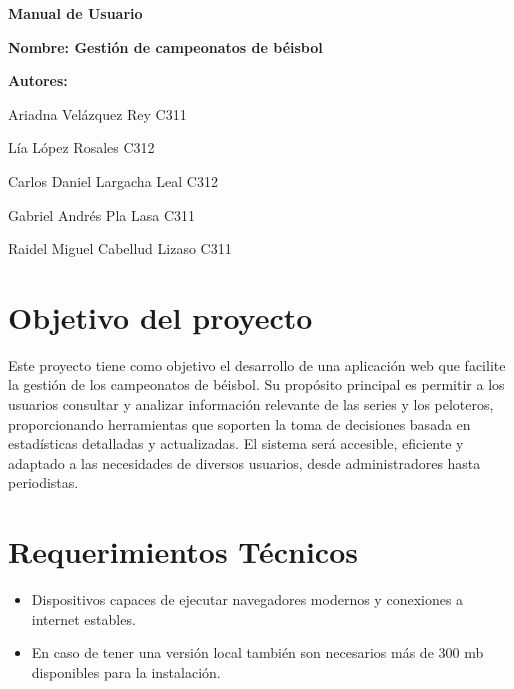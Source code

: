 \documentclass{report}
\begin{document}
    \begin{titlepage}
        \centering
        {\bfseries\Huge Manual de Usuario \par}
        \vspace*{1cm}
        \vspace*{3cm}
        \vspace*{1cm}
        {\LARGE \textbf{Nombre: Gestión de campeonatos de béisbol} }
        \vfill
        {\bfseries\LARGE Autores: \par}
        {\Large Ariadna Vel\'azquez Rey  C311 \par} 
        {\Large L\'ia L\'opez Rosales  C312 \par} 
        {\Large Carlos Daniel Largacha Leal  C312 \par} 
        {\Large Gabriel Andr\'es Pla Lasa  C311 \par} 
        {\Large Raidel Miguel Cabellud Lizaso C311 \par} 
        \vfill
    \end{titlepage}

    \section*{Objetivo del proyecto}
    Este proyecto tiene como objetivo el desarrollo de una aplicación web que facilite la gestión de los 
    campeonatos de béisbol. Su propósito principal es permitir a los usuarios consultar y analizar información 
    relevante de las series y los peloteros, proporcionando herramientas que soporten la toma de decisiones 
    basada en estadísticas detalladas y actualizadas. El sistema será accesible, eficiente y adaptado a las 
    necesidades de diversos usuarios, desde administradores hasta periodistas.


    \section*{Requerimientos Técnicos}
    \begin{itemize}
        \item Dispositivos capaces de ejecutar navegadores modernos y conexiones a internet estables.
        \item En caso de tener una versión local también son necesarios más de 300 mb disponibles para la instalación.
    \end{itemize}
    
\end{document}
